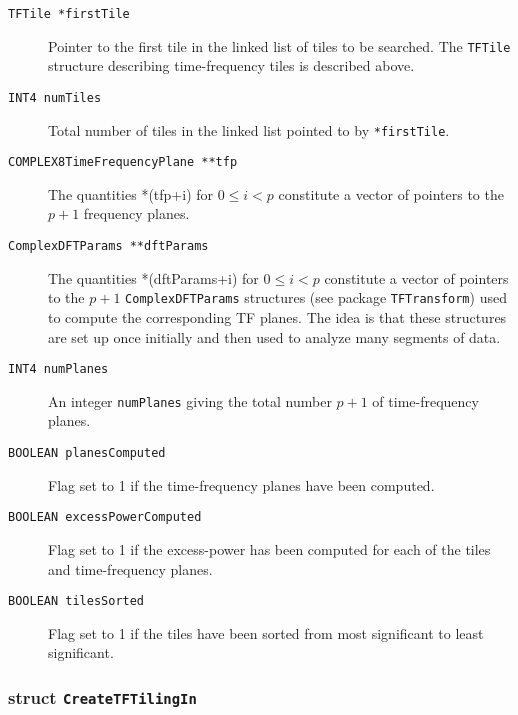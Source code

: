 \begin{description}
\item[\texttt{TFTile *firstTile}] Pointer to the first tile in the linked list
of tiles to be searched.  The \verb+TFTile+ structure describing
time-frequency tiles is described above.

\item[\texttt{INT4 numTiles}] Total number of tiles in the linked list pointed
to by \texttt{*firstTile}.

\item[\texttt{COMPLEX8TimeFrequencyPlane **tfp}] The quantities *(tfp+i) for $0 \le 
i < p$ constitute a vector of pointers to the $p+1$ frequency planes.

\item[\texttt{ComplexDFTParams **dftParams}] The quantities *(dftParams+i) for $0
\le i < p$ constitute a vector of pointers to the $p+1$
\verb+ComplexDFTParams+ structures (see package \verb+TFTransform+) used to
compute the corresponding TF planes.  The idea is that these structures are
set up once initially and then used to analyze many segments of data.

\item[\texttt{INT4 numPlanes}] An integer \verb+numPlanes+ giving the total 
number $p+1$ of time-frequency planes.

\item[\texttt{BOOLEAN planesComputed}] Flag set to 1 if the time-frequency
planes have been computed.

\item[\texttt{BOOLEAN excessPowerComputed}] Flag set to 1 if the excess-power
has been computed for each of the tiles and time-frequency planes.

\item[\texttt{BOOLEAN tilesSorted}] Flag set to 1 if the tiles have been
sorted from most significant to least significant.
\end{description}

\subsubsection*{struct \texttt{CreateTFTilingIn}}


